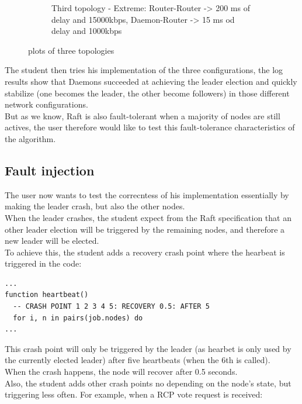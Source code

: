 \documentclass{eplmastersthesis}
\begin{document}
\begin{figure}[H]
\begin{subfigure}{.33\textwidth}
              \caption{Third topology - Extreme: Router-Router -> 200 ms of delay and 15000kbps, Daemon-Router -> 15 ms od delay and 1000kbps}
              \label{fig:topo3}
            \end{subfigure}
            \caption{plots of three topologies}
            \label{fig:topologies}
          \end{figure}

          The student then tries his implementation of the three configurations,
          the log results show that Daemons succeeded at achieving the leader
          election and quickly stabilize (one becomes the leader, the other
          become followers) in those different network configurations.\\
          But as we know, Raft is also fault-tolerant when a majority of
          nodes are still actives, the user therefore would like to test this
          fault-tolerance characteristics of the algorithm.

        \subsection{Fault injection}

          The user now wants to test the correcntess of his implementation
          essentially by making the leader crash, but also the other nodes.\\
          When the leader crashes, the student expect from the Raft specification
          that an other leader election will be triggered by the remaining
          nodes, and therefore a new leader will be elected.\\
          To achieve this, the student adds a recovery crash point where the
          hearbeat is triggered in the code:

          \begin{lstlisting}[style=MyLua]
...
function heartbeat()
  -- CRASH POINT 1 2 3 4 5: RECOVERY 0.5: AFTER 5
  for i, n in pairs(job.nodes) do
...
          \end{lstlisting}

          This crash point will only be triggered by the leader (as hearbet
          is only used by the currently elected leader) after five heartbeats
          (when the 6th is called).\\
          When the crash happens, the node will recover after 0.5 seconds.\\
          Also, the student adds other crash points no depending on the
          node's state, but triggering less often. For example, when a RCP vote
          request is received:
\end{document}
